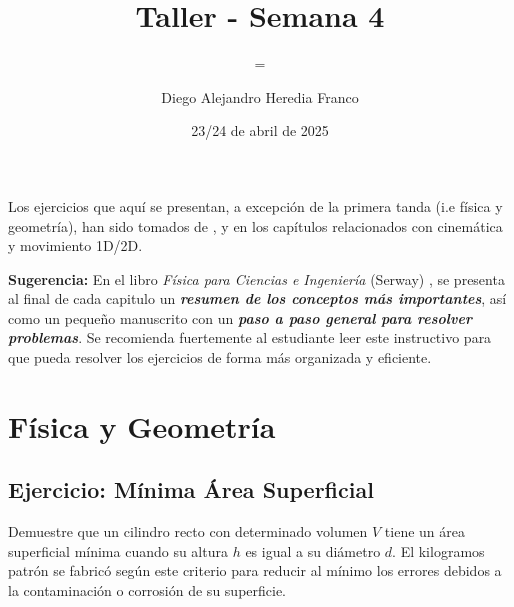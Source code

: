 \documentclass{replab}
\title{Taller - Semana 4}
\author{Diego Alejandro Heredia Franco}
\date{23/24 de abril de 2025}
\subtitle={Física - Cinemática 1D/2D}
\begin{document}
\setlength{\parindent}{0pt}
	
	\pagestyle{fancy}
	\unspacedoperators
	
	{\begin{tcolorbox}[colframe=white, colback=principaldos, arc=8pt]
		\begin{center}
			\maketitle

		\end{center}
	\end{tcolorbox}}

	Los ejercicios que aquí se presentan, a excepción de la primera tanda (i.e física y geometría), han sido tomados de \cite{lanaturaleza}, \cite{serway} y \cite{londono} en los capítulos relacionados con cinemática y movimiento 1D/2D.\\

{\begin{tcolorbox}[colframe=red!50!black, colback=red!5!white, arc=8pt]
	\textbf{Sugerencia:} En el libro \textit{Física para Ciencias e Ingeniería} (Serway) \cite{serway}, se presenta al final de cada capitulo un \textit{\textbf{resumen de los conceptos más importantes}}, así como un pequeño manuscrito con un \textit{\textbf{paso a paso general para resolver problemas}}. Se recomienda fuertemente al estudiante leer este instructivo para que pueda resolver los ejercicios de forma más organizada y eficiente.
\end{tcolorbox}}

	\section{Física y Geometría}

	\subsection{Ejercicio: Mínima Área Superficial}
	Demuestre que un cilindro recto con determinado volumen $V$ tiene un área superficial mínima cuando su altura $h$ es igual a su diámetro $d$. El kilogramos patrón se fabricó según este criterio para reducir al mínimo los errores debidos a la contaminación o corrosión de su superficie. 
\end{document}
